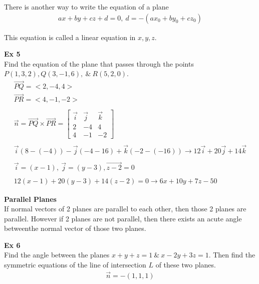 \documentclass{article}
\begin{document}
  There is another way to write the equation of a plane
  \[
    \begin{gathered}
    ax+by+cz+d=0, ~ d = -(ax_{0}+by_{0} + cz_{0}   )
    \end{gathered}
  \]

  This equation is called a linear equation in $ x,y,z $.

  \textbf{Ex 5}\\
  Find the equation of the plane that passes through the points $ P(1,3,2), Q(3,-1,6),~\&~ R(5,2,0) $.
  \[
    \begin{gathered}
    \vec{PQ}=< 2, -4, 4 >\\
    \vec{PR}=< 4, -1, -2 >\\
    ~\\
    \vec{n}=\vec{PQ} \times \vec{PR} = \begin{bmatrix}
      \vec{i} &\vec{j} &\vec{k}\\
      2 &-4 &4\\
      4 &-1 &-2
    \end{bmatrix}\\
    ~\\
    \vec{i}(8-(-4)) - \vec{j}(-4 - 16) + \vec{k}(-2 - (-16))\to 12\vec{i} + 20\vec{j} + 14\vec{k}\\
    ~\\
    \vec{i} = (x-1), ~ \vec{j}=(y-3), \vec{z-2}=0\\
    ~\\
    12(x-1)+20(y-3)+14(z-2)=0\to \boxed{6x+10y+7z-50}
    \end{gathered}
  \]

  \textbf{Parallel Planes}\\
  If normal vectors of 2 planes are parallel to each other, then those 2 planes are parallel. However if 2 planes are not parallel, then there exists an acute angle betweenthe normal vector of those two planes.

  \textbf{Ex 6}\\
  Find the angle between the planes $ x+y+z=1 ~\&~ x-2y+3z=1$. Then find the symmetric equations of the line of intersection $ L $ of these two planes.
  \[
    \begin{gathered}
    \vec{n}=-(1,1,1)
    \end{gathered}
  \]
  
  
\end{document}
